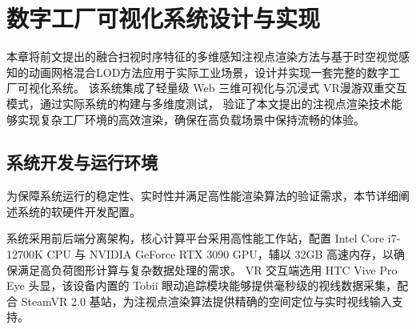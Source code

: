 \chapter{数字工厂可视化系统设计与实现}
本章将前文提出的融合扫视时序特征的多维感知注视点渲染方法与基于时空视觉感知的动画网格混合LOD方法应用于实际工业场景，设计并实现一套完整的数字工厂可视化系统。
该系统集成了轻量级 Web 三维可视化与沉浸式 VR漫游双重交互模式，通过实际系统的构建与多维度测试，
验证了本文提出的注视点渲染技术能够实现复杂工厂环境的高效渲染，确保在高负载场景中保持流畅的体验。
\section{系统开发与运行环境}

为保障系统运行的稳定性、实时性并满足高性能渲染算法的验证需求，本节详细阐述系统的软硬件开发配置。

系统采用前后端分离架构，核心计算平台采用高性能工作站，配置 Intel Core i7-12700K CPU 与 NVIDIA GeForce RTX 3090 GPU，辅以 32GB 高速内存，以确保满足高负荷图形计算与复杂数据处理的需求。
VR 交互端选用 HTC Vive Pro Eye 头显，该设备内置的 Tobii 眼动追踪模块能够提供毫秒级的视线数据采集，配合 SteamVR 2.0 基站，为注视点渲染算法提供精确的空间定位与实时视线输入支持。

